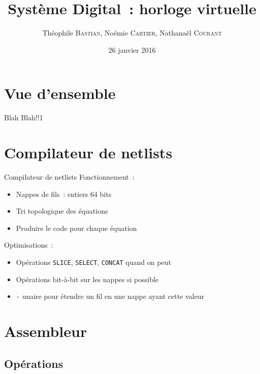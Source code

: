 \documentclass[11pt]{beamer}
\author{Théophile \textsc{Bastian}, Noémie \textsc{Cartier}, Nathanaël \textsc{Courant}}
\title{Système Digital~: horloge virtuelle}
\date{26 janvier 2016}
\begin{document}
\begin{frame}
\titlepage
\end{frame}


\section*{Vue d'ensemble}

\begin{frame}{Blah}
Blah!!1
\end{frame}


\begin{frame}
\tableofcontents
\end{frame}

\section{Compilateur de netlists}
\begin{frame}{Compilateur de netlists}
Fonctionnement~:
\begin{itemize}
\item{Nappes de fils~: entiers 64 bits}
\item{Tri topologique des équations}
\item{Produire le code pour chaque équation}
\end{itemize}

Optimisations~:
\begin{itemize}
\item{Opérations \verb!SLICE!, \verb!SELECT!, \verb!CONCAT! quand on
    peut}
\item{Opérations bit-à-bit sur les nappes si possible}
\item{\og{}\verb!-!\fg{} unaire pour étendre un fil en une nappe ayant cette
    valeur}
\end{itemize}
\end{frame}

\section{Assembleur}

\subsection{Opérations}
\end{document}
